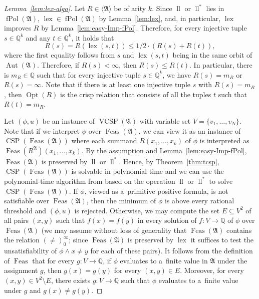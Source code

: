 \documentclass[preprint,12pt]{elsarticle}
\newcommand{\Q}{\mathbb Q}
\newcommand{\bA}{{\mathfrak A}}
\newcommand{\checked}[1]{#1}
\DeclareMathOperator{\Aut}{Aut}
\DeclareMathOperator{\fPol}{fPol}
\DeclareMathOperator{\vcsp}{VCSP}
\DeclareMathOperator{\CSP}{CSP}
\DeclareMathOperator{\Opt}{Opt}
\DeclareMathOperator{\Feas}{Feas}
\DeclareMathOperator{\lele}{ll}
\DeclareMathOperator{\lex}{lex}
\begin{document}
\begin{proof}[Lemma~\ref{lem:lex-algo}]
Let $R \in \langle \bA \rangle$ be of arity $k$. 
Since \checked{$\lele$ or $\lele^*$ lies in $\fPol(\bA)$,} $\lex \in \fPol(\bA)$ \checked{by Lemma~\ref{lem:lex}}, \checked{and, in particular, $\lex$} improves $R$ \checked{by Lemma~\ref{lem:easy-Imp-fPol}}. Therefore, for every injective tuple $s \in \Q^k$ and any $t \in \Q^k$, it holds that
\begin{equation*}
R(s)=R(\lex(s,t)) \leq 1/2 \cdot (R(s)+R(t)),
\label{eq:lex}
\end{equation*}
where the first equality follows from $s$ and $\lex(s,t)$ being in the same orbit of $\Aut(\bA)$.
Therefore, if $R(s) < \infty$, then $R(s) \leq R(t)$.  In particular, there is $m_R \in \Q$ such that for every injective tuple $s \in \Q^k$, we have $R(s)=m_R$ or $R(s)=\infty$. Note that if there is at least one injective tuple $s$ with $R(s)=m_R$, then $\Opt(R)$ is the crisp relation that consists of all the tuples $t$ such that $R(t) = m_R$.

Let $(\phi,u)$ be an instance of $\vcsp(\bA)$ with variable set $V = \{v_1, \dots, v_N\}$.
Note that if we interpret $\phi$ over $\Feas(\bA)$, we can view it as an instance of $\CSP(\Feas(\bA))$ where each summand $R(x_1, \dots, x_k)$ of $\phi$ is interpreted as $\Feas(R^\bA)(x_1, \dots, x_k)$.
By the assumption \checked{and Lemma~\ref{lem:easy-Imp-fPol}}, 
$\Feas(\bA)$ is preserved by $\lele$ or $\lele^*$. 
Hence, by Theorem~\ref{thm:tcsp}, $\CSP(\Feas(\bA))$ is solvable in polynomial time and we can use the polynomial-time algorithm from \cite{tcsps-journal} based on the operation $\lele$ or $\lele^*$ to solve $\CSP(\Feas(\bA))$.
If $\phi$, viewed as a~primitive positive formula, is not satisfiable over $\Feas(\bA)$, then the minimum of $\phi$ is above every rational threshold and $(\phi,u)$ is rejected. Otherwise, 
we may compute the set $E \subseteq V^2$ of all pairs $(x,y)$ such that $f(x)=f(y)$ in every solution of $f \colon V \to \Q$ of $\phi$
over $\Feas(\bA)$ (we may assume without loss of generality that $\Feas(\bA)$ contains the relation $(\neq)_0^\infty$; since $\Feas(\bA)$ is preserved by $\lex$ it suffices to test the unsatisfiability of $\phi \wedge x \neq y$ for each of these pairs).  
It follows from the definition of $\Feas$ that for every $g \colon V \to \Q$, if $\phi$ evaluates to a~finite value in $\bA$ under the assignment $g$, then $g(x)=g(y)$ for every $(x,y) \in E$. Moreover, for every $(x,y) \in V^2\setminus E$, there exists $g \colon V \to \Q$ such that $\phi$ evaluates to a~finite value under $g$ and $g(x) \neq g(y)$.


\end{proof}
\end{document}
